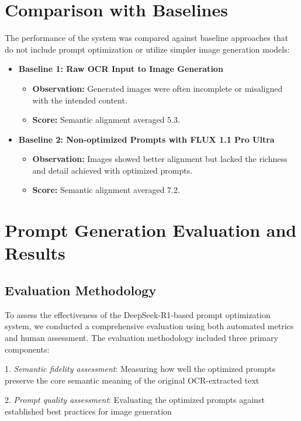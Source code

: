 \section{Comparison with Baselines}
The performance of the system was compared against baseline approaches that do not include prompt optimization or utilize simpler image generation models:
\begin{itemize}
    \item \textbf{Baseline 1: Raw OCR Input to Image Generation}
    \begin{itemize}
        \item \textbf{Observation:} Generated images were often incomplete or misaligned with the intended content.
        \item \textbf{Score:} Semantic alignment averaged 5.3.
    \end{itemize}
    \item \textbf{Baseline 2: Non-optimized Prompts with FLUX 1.1 Pro Ultra}
    \begin{itemize}
        \item \textbf{Observation:} Images showed better alignment but lacked the richness and detail achieved with optimized prompts.
        \item \textbf{Score:} Semantic alignment averaged 7.2.
    \end{itemize}
\end{itemize}


\section{Prompt Generation Evaluation and Results}

\subsection{Evaluation Methodology}

To assess the effectiveness of the DeepSeek-R1-based prompt optimization system, we conducted a comprehensive evaluation using both automated metrics and human assessment. The evaluation methodology included three primary components:

1. \textit{Semantic fidelity assessment}: Measuring how well the optimized prompts preserve the core semantic meaning of the original OCR-extracted text

2. \textit{Prompt quality assessment}: Evaluating the optimized prompts against established best practices for image generation

